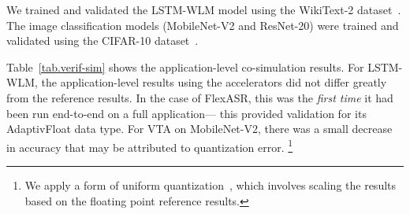 We trained and validated the LSTM-WLM model using the WikiText-2 dataset~\cite{merity2016pointer}.
%
The image classification models (MobileNet-V2 and ResNet-20) were trained and validated using the CIFAR-10 dataset~\cite{cifar10}.

Table~\ref{tab.verif-sim} shows the application-level co-simulation results.
%
%
%
%
%
%
For LSTM-WLM,
  the application-level results using the accelerators
  did not differ greatly
  from the reference results.
In the case of FlexASR,
  this was the \textit{first time}
  it had been run end-to-end on a full application---%
  this provided validation for its AdaptivFloat data type.
For VTA on MobileNet-V2,
  there was a small decrease in accuracy
  that may be attributed
  to quantization error.%
\footnote{We apply a form of uniform quantization~\cite{jacob2017quantization},
  which involves scaling the results
  based on the floating point reference results.}

